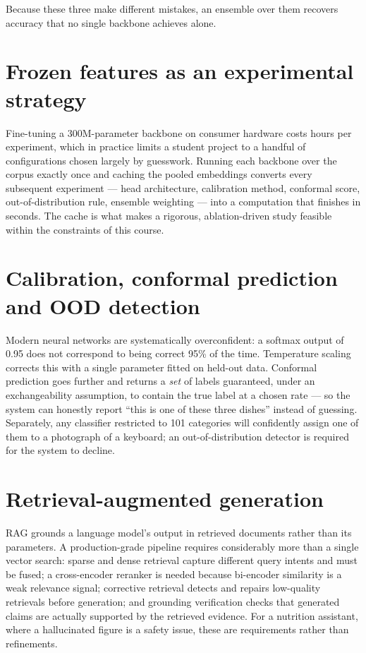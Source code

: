 \documentclass[12pt,a4paper,oneside]{report}
\begin{document}
Because these three make different mistakes, an ensemble over them recovers
accuracy that no single backbone achieves alone.

\section{Frozen features as an experimental strategy}

Fine-tuning a 300M-parameter backbone on consumer hardware costs hours per
experiment, which in practice limits a student project to a handful of
configurations chosen largely by guesswork. Running each backbone over the
corpus exactly once and caching the pooled embeddings converts every subsequent
experiment --- head architecture, calibration method, conformal score,
out-of-distribution rule, ensemble weighting --- into a computation that
finishes in seconds. The cache is what makes a rigorous, ablation-driven study
feasible within the constraints of this course.

\section{Calibration, conformal prediction and OOD detection}

Modern neural networks are systematically overconfident: a softmax output of
0.95 does not correspond to being correct 95\% of the time. Temperature scaling
corrects this with a single parameter fitted on held-out data. Conformal
prediction goes further and returns a \emph{set} of labels guaranteed, under an
exchangeability assumption, to contain the true label at a chosen rate --- so
the system can honestly report ``this is one of these three dishes'' instead of
guessing. Separately, any classifier restricted to 101 categories will
confidently assign one of them to a photograph of a keyboard; an
out-of-distribution detector is required for the system to decline.

\section{Retrieval-augmented generation}

RAG grounds a language model's output in retrieved documents rather than its
parameters. A production-grade pipeline requires considerably more than a single
vector search: sparse and dense retrieval capture different query intents and
must be fused; a cross-encoder reranker is needed because bi-encoder similarity
is a weak relevance signal; corrective retrieval detects and repairs low-quality
retrievals before generation; and grounding verification checks that generated
claims are actually supported by the retrieved evidence. For a nutrition
assistant, where a hallucinated figure is a safety issue, these are requirements
rather than refinements.
\end{document}
